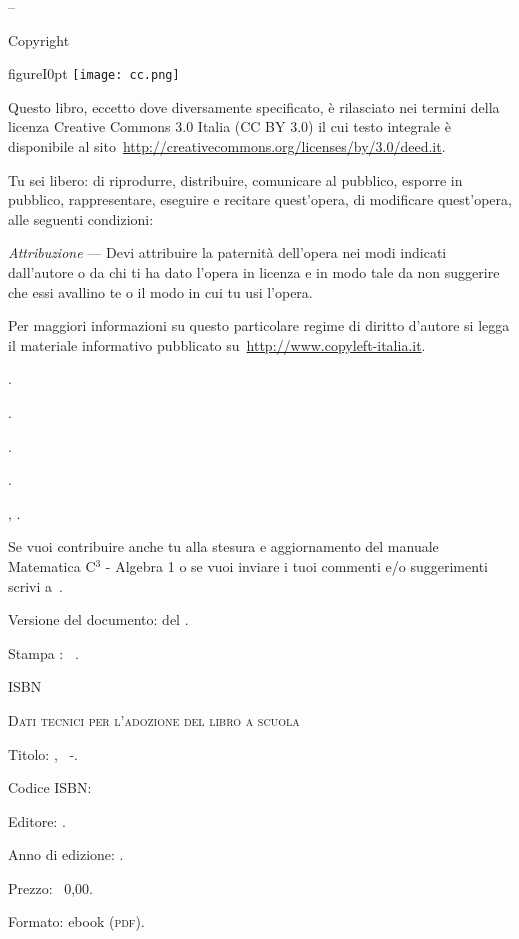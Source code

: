\thispagestyle{empty}
{\setlength{\parindent}{0em}\small{
\begin{center}
{\large{\serie – \titolo}}

Copyright {\textcopyright} {\anno} \editore
\end{center}

\begin{wrapfloat}{figure}{I}{0pt}
\texttt{[image: cc.png]}
\end{wrapfloat}

Questo libro, eccetto dove diversamente specificato, è rilasciato nei termini 
della licenza Creative Commons 3.0 Italia
(CC BY 3.0) il cui testo integrale è disponibile al 
sito~\url{http://creativecommons.org/licenses/by/3.0/deed.it}.

Tu sei libero:
di riprodurre, distribuire, comunicare al pubblico, esporre in pubblico, rappresentare,
eseguire e recitare quest'opera, di modificare quest'opera, alle seguenti condizioni:

\emph{Attribuzione} --- Devi attribuire la paternità dell'opera nei modi indicati dall'autore o da chi ti ha dato l'opera
in licenza e in modo tale da non suggerire che essi avallino te o il modo in cui tu usi l'opera.

 Per maggiori informazioni su questo particolare regime di diritto d'autore si
legga il materiale informativo pubblicato su~\url{http://www.copyleft-italia.it}.

 \coord .

 \autori.

 \colab.

 {\texautori}.

 {\texcol, \texautori}.

 Se vuoi contribuire anche tu alla stesura e aggiornamento
del manuale Matematica C$^3$ - Algebra 1 o se vuoi inviare i tuoi commenti e/o suggerimenti scrivi
a~.

\vspace{2ex}
 Versione del documento: {\docvers} del {\oggi}.

 Stampa \edizione : \mese\ \anno.

 ISBN \mcisbn

\vspace{2ex}
 {\scshape{Dati tecnici per l'adozione del libro a scuola}}

 Titolo: \serie, \titolo\ -\edizione.

 Codice ISBN: \mcisbn

 Editore: \href{http://www.matematicamente.it}{\editore}.

 Anno di edizione: \anno.

 Prezzo: \officialeuro\ 0,00.

 Formato: ebook (\scshape{pdf}).
}}
\cleardoublepage
